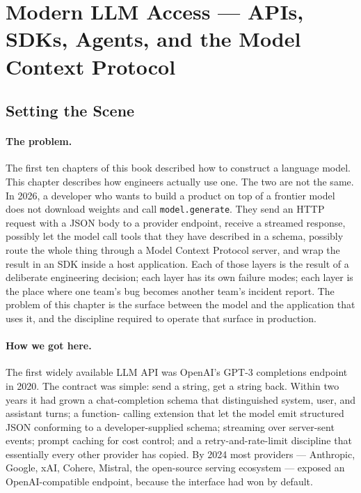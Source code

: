 \section{Modern LLM Access --- APIs, SDKs, Agents, and the Model Context Protocol}

\subsection*{Setting the Scene}

\paragraph{The problem.}
The first ten chapters of this book described how to construct a
language model. This chapter describes how engineers actually use
one. The two are not the same. In 2026, a developer who wants to
build a product on top of a frontier model does not download
weights and call \texttt{model.generate}. They send an HTTP request
with a JSON body to a provider endpoint, receive a streamed
response, possibly let the model call tools that they have
described in a schema, possibly route the whole thing through a
Model Context Protocol server, and wrap the result in an SDK
inside a host application. Each of those layers is the result of
a deliberate engineering decision; each layer has its own failure
modes; each layer is the place where one team's bug becomes another
team's incident report. The problem of this chapter is the surface
between the model and the application that uses it, and the
discipline required to operate that surface in production.

\paragraph{How we got here.}
The first widely available LLM API was OpenAI's GPT-3 completions
endpoint in 2020. The contract was simple: send a string, get a
string back. Within two years it had grown a chat-completion schema
that distinguished system, user, and assistant turns; a function-
calling extension that let the model emit structured JSON conforming
to a developer-supplied schema; streaming over server-sent events;
prompt caching for cost control; and a retry-and-rate-limit
discipline that essentially every other provider has copied. By
2024 most providers --- Anthropic, Google, xAI, Cohere, Mistral,
the open-source serving ecosystem --- exposed an OpenAI-compatible
endpoint, because the interface had won by default.

